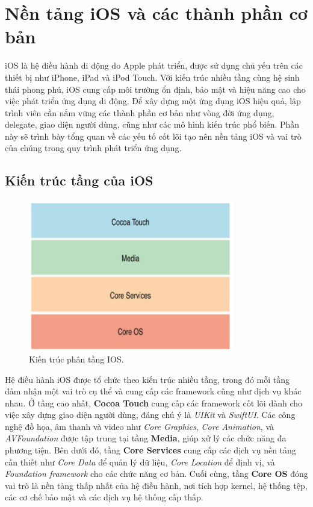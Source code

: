 
\section{Nền tảng iOS và các thành phần cơ bản}
\hspace*{0.8cm}iOS là hệ điều hành di động do Apple phát triển, được sử dụng chủ yếu trên các thiết bị như iPhone, iPad và iPod Touch. Với kiến trúc nhiều tầng cùng hệ sinh thái phong phú, iOS cung cấp môi trường ổn định, bảo mật và hiệu năng cao cho việc phát triển ứng dụng di động. Để xây dựng một ứng dụng iOS hiệu quả, lập trình viên cần nắm vững các thành phần cơ bản như vòng đời ứng dụng, delegate, giao diện người dùng, cũng như các mô hình kiến trúc phổ biến. Phần này sẽ trình bày tổng quan về các yếu tố cốt lõi tạo nên nền tảng iOS và vai trò của chúng trong quy trình phát triển ứng dụng.
    \subsection{Kiến trúc tầng của iOS}
        \begin{flushleft}
            \begin{figure}[H] %
                \centering
                \includegraphics[width=0.8\textwidth]{images/kientrucios.png}
                \caption{Kiến trúc phân tầng IOS\cite{kientrucios}.}
                \label{fig:kientrucios}
            \end{figure}

            \hspace*{0.8cm}Hệ điều hành iOS được tổ chức theo kiến trúc nhiều tầng, trong đó mỗi tầng đảm nhận một vai trò cụ thể và cung cấp các framework cũng như dịch vụ khác nhau. Ở tầng cao nhất, \textbf{Cocoa Touch} cung cấp các framework cốt lõi dành cho việc xây dựng giao diện người dùng, đáng chú ý là \textit{UIKit} và \textit{SwiftUI}. Các công nghệ đồ họa, âm thanh và video như \textit{Core Graphics}, \textit{Core Animation}, và \textit{AVFoundation} được tập trung tại tầng \textbf{Media}, giúp xử lý các chức năng đa phương tiện. Bên dưới đó, tầng \textbf{Core Services} cung cấp các dịch vụ nền tảng cần thiết như \textit{Core Data} để quản lý dữ liệu, \textit{Core Location} để định vị, và \textit{Foundation framework} cho các chức năng cơ bản. Cuối cùng, tầng \textbf{Core OS} đóng vai trò là nền tảng thấp nhất của hệ điều hành, nơi tích hợp kernel, hệ thống tệp, các cơ chế bảo mật và các dịch vụ hệ thống cấp thấp.

       
        \end{flushleft}
